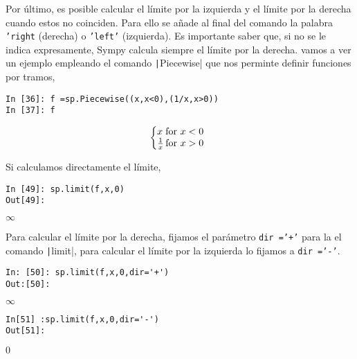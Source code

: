 Por último, es posible calcular el límite por la izquierda y el límite por la derecha cuando estos no coinciden. Para ello se añade al final del comando la palabra \texttt{'right} (derecha) o \texttt{'left'} (izquierda). Es importante saber que, si no se le indica expresamente, Sympy calcula siempre el límite por la derecha. vamos a ver un ejemplo empleando el comando \texttt|Piecewise| que nos perminte definir funciones por tramos,

\begin{center}
	\begin{minipage}{.6\textwidth}
		\begin{verbatim}
In [36]: f =sp.Piecewise((x,x<0),(1/x,x>0))
In [37]: f
		\end{verbatim}
				\begin{equation*}
			\left\{
			\begin{array}{@{}l@{\,}l}
				x &  \text{for}\ x<0\\
			 \frac{1}{x} & \text{for}\ x>0
			\end{array}
			\right.
		\end{equation*}
	\end{minipage}
\end{center}
Si calculamos directamente el límite,
\begin{center}
	\begin{minipage}{.6\textwidth}
		\begin{verbatim}
In [49]: sp.limit(f,x,0)
Out[49]: 
		\end{verbatim}
$\infty$
	\end{minipage}
\end{center}

Para calcular el límite por la derecha, fijamos el parámetro \texttt{dir ='+'} para la el comando \texttt|limit|, para calcular el límite por la izquierda lo fijamos a \texttt{dir ='-'}.

\begin{center}
	\begin{minipage}{.6\textwidth}
		\begin{verbatim}
In: [50]: sp.limit(f,x,0,dir='+')
Out:[50]: 
		\end{verbatim}
		$\infty$
		\begin{verbatim}
In[51] :sp.limit(f,x,0,dir='-')
Out[51]: 
\end{verbatim}
$0$
\end{minipage}
\end{center}

